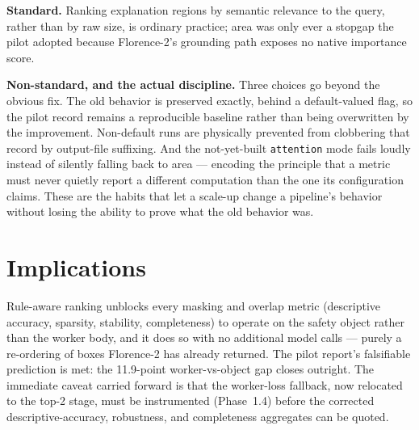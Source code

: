 \textbf{Standard.} Ranking explanation regions by semantic relevance to the query, rather than by
raw size, is ordinary practice; area was only ever a stopgap the pilot adopted because Florence-2's
grounding path exposes no native importance score.

\textbf{Non-standard, and the actual discipline.} Three choices go beyond the obvious fix. The old
behavior is preserved exactly, behind a default-valued flag, so the pilot record remains a
reproducible baseline rather than being overwritten by the improvement. Non-default runs are
physically prevented from clobbering that record by output-file suffixing. And the not-yet-built
\texttt{attention} mode fails loudly instead of silently falling back to area --- encoding the
principle that a metric must never quietly report a different computation than the one its
configuration claims. These are the habits that let a scale-up change a pipeline's behavior without
losing the ability to prove what the old behavior was.

\section{Implications}

Rule-aware ranking unblocks every masking and overlap metric (descriptive accuracy, sparsity,
stability, completeness) to operate on the safety object rather than the worker body, and it does so
with no additional model calls --- purely a re-ordering of boxes Florence-2 has already returned. The
pilot report's falsifiable prediction is met: the 11.9-point worker-vs-object gap closes outright.
The immediate caveat carried forward is that the worker-loss fallback, now relocated to the top-2
stage, must be instrumented (Phase~1.4) before the corrected descriptive-accuracy, robustness, and
completeness aggregates can be quoted.
